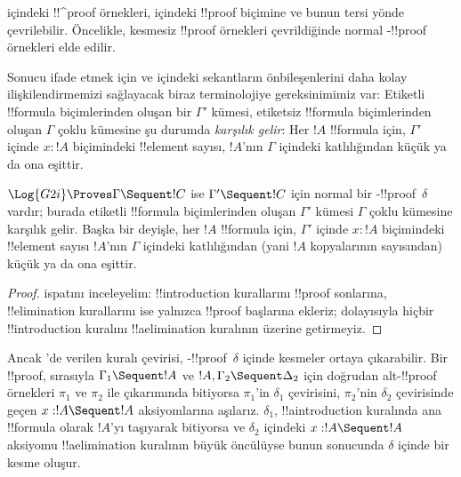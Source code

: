 \documentclass[../../../include/open-logic-section]{subfiles}
\begin{document}


 içindeki !!^{proof} örnekleri,  içindeki !!{proof} biçimine
ve bunun tersi yönde çevrilebilir. Öncelikle, kesmesiz 
!!{proof} örnekleri çevrildiğinde normal -!!{proof} örnekleri elde edilir.

Sonucu ifade etmek için  ve  içindeki sekantların
önbileşenlerini daha kolay ilişkilendirmemizi sağlayacak biraz
terminolojiye gereksinimimiz var: Etiketli !!{formula} biçimlerinden oluşan bir
$\Gamma'$ kümesi, etiketsiz !!{formula} biçimlerinden oluşan $\Gamma$ çoklu
kümesine şu durumda \emph{karşılık gelir}: Her $!A$ !!{formula} için,
$\Gamma'$ içinde $x : !A$ biçimindeki !!{element} sayısı, $!A$'nın
$\Gamma$ içindeki katlılığından küçük ya da ona eşittir.

\begin{cor}
$\Log{G2i} \Proves \Gamma \Sequent !C$ ise $\Gamma' \Sequent !C$
için normal bir -!!{proof}~$\delta$ vardır; burada etiketli
!!{formula} biçimlerinden oluşan $\Gamma'$ kümesi $\Gamma$ çoklu kümesine
karşılık gelir. Başka bir deyişle, her $!A$ !!{formula} için,
$\Gamma'$ içinde $x : !A$ biçimindeki !!{element} sayısı $!A$'nın
$\Gamma$ içindeki katlılığından (yani $!A$ kopyalarının sayısından)
küçük ya da ona eşittir.
\end{cor}

\begin{proof}
 ispatını inceleyelim:
!!{introduction} kurallarını !!{proof} sonlarına, !!{elimination}
kurallarını ise yalnızca !!{proof} başlarına ekleriz; dolayısıyla hiçbir
!!{introduction} kuralını !!a{elimination} kuralının üzerine getirmeyiz.
\end{proof}

Ancak 'de verilen \Cut{} kuralı
çevirisi, -!!{proof}~$\delta$ içinde kesmeler ortaya
çıkarabilir. Bir  !!{proof}, sırasıyla $\Gamma_1 \Sequent !A$
ve $!A, \Gamma_2 \Sequent \Delta_2$ için doğrudan alt-!!{proof} örnekleri
$\pi_1$ ve $\pi_2$ ile \Cut{} çıkarımında bitiyorsa $\pi_1$'in
$\delta_1$ çevirisini, $\pi_2$'nin $\delta_2$ çevirisinde geçen $x:!A
\Sequent !A$ aksiyomlarına aşılarız. $\delta_1$, !!a{introduction}
kuralında ana !!{formula} olarak $!A$'yı taşıyarak bitiyorsa ve
$\delta_2$ içindeki $x:!A \Sequent !A$ aksiyomu !!a{elimination}
kuralının büyük öncülüyse bunun sonucunda $\delta$ içinde bir kesme
oluşur.
\end{document}
